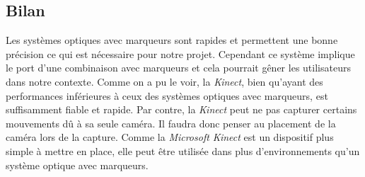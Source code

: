 \subsection{Bilan}
Les systèmes optiques avec marqueurs sont rapides et permettent une bonne précision ce qui est nécessaire pour notre projet. Cependant ce système implique le port d'une combinaison avec marqueurs et cela pourrait gêner les utilisateurs dans notre contexte. Comme on a pu le voir, la \emph{Kinect}, bien qu'ayant des performances inférieures à ceux des systèmes optiques avec marqueurs, est suffisamment fiable et rapide. Par contre, la \emph{Kinect} peut ne pas capturer certains mouvements dû à sa seule caméra. Il faudra donc penser au placement de la caméra lors de la capture. Comme la \emph{Microsoft Kinect} est un dispositif plus simple à mettre en place, elle peut être utilisée dans plus d'environnements qu'un système optique avec marqueurs.